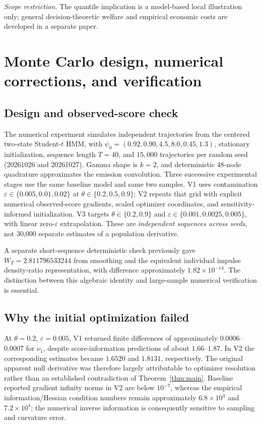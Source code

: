 \documentclass[11pt,a4paper]{article}
\newcommand{\eps}{\varepsilon}
\begin{document}
\noindent\textit{Scope restriction.} The quantile implication is a model-based local illustration only; general decision-theoretic welfare and empirical economic costs are developed in a separate paper.\par
\section{Monte Carlo design, numerical corrections, and verification}\label{sec:mc}
\subsection{Design and observed-score check}
The numerical experiment simulates independent trajectories from the centered two-state Student-$t$ HMM, with $\psi_0=(0.92,0.90,4.5,8.0,0.45,1.3)$, stationary initialization, sequence length $T=40$, and $15{,}000$ trajectories per random seed (20261026 and 20261027). Gamma shape is $k=2$, and deterministic 48-node quadrature approximates the emission convolution. Three successive experimental stages use the same baseline model and same two samples. V1 uses contamination $\eps\in\{0.005,0.01,0.02\}$ at $\theta\in\{0.2,0.5,0.9\}$; V2 repeats that grid with explicit numerical observed-score gradients, scaled optimizer coordinates, and sensitivity-informed initialization. V3 targets $\theta\in\{0.2,0.9\}$ and $\eps\in\{0.001,0.0025,0.005\}$, with linear zero-$\eps$ extrapolation. These are \emph{independent sequences across seeds}, not 30,000 separate estimates of a population derivative.

A separate short-sequence deterministic check previously gave $W_T=2.811796533244$ from smoothing and the equivalent individual impulse density-ratio representation, with difference approximately $1.82\times10^{-14}$. The distinction between this algebraic identity and large-sample numerical verification is essential.
\subsection{Why the initial optimization failed}
At $\theta=0.2$, $\eps=0.005$, V1 returned finite differences of approximately $0.0006$--$0.0007$ for $\nu_1$, despite score-information predictions of about $1.66$--$1.87$. In V2 the corresponding estimates became $1.6520$ and $1.8131$, respectively. The original apparent null derivative was therefore largely attributable to optimizer resolution rather than an established contradiction of Theorem~\ref{thm:main}. Baseline reported gradient infinity norms in V2 are below $10^{-7}$, whereas the empirical information/Hessian condition numbers remain approximately $6.8\times10^4$ and $7.2\times10^4$; the numerical inverse information is consequently sensitive to sampling and curvature error.
\end{document}

